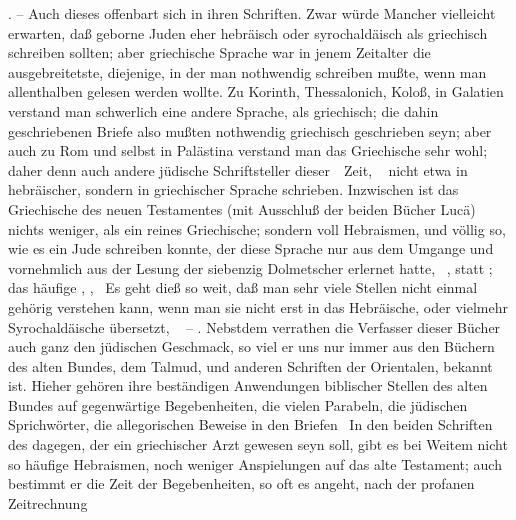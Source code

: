 \begin{aufza}
\item {}. -- Auch dieses offenbart sich in ihren Schriften. Zwar würde Mancher vielleicht erwarten, daß geborne Juden eher hebräisch oder syrochaldäisch als griechisch schreiben sollten; aber griechische Sprache war in jenem Zeitalter die ausgebreitetste, diejenige, in der man nothwendig schreiben mußte, wenn man allenthalben gelesen werden wollte. Zu Korinth, Thessalonich, Koloß, in Galatien verstand man schwerlich eine andere Sprache, als griechisch; die dahin geschriebenen Briefe also mußten nothwendig griechisch geschrieben seyn; aber auch zu Rom und selbst in Palästina verstand man das Griechische sehr wohl; daher denn auch andere jüdische Schriftsteller dieser~\ Zeit, \zB\  nicht etwa in hebräischer, sondern in griechischer Sprache schrieben. Inzwischen ist das Griechische des neuen Testamentes (mit Ausschluß der beiden Bücher Lucä) nichts weniger, als ein reines Griechische; sondern voll Hebraismen, und völlig so, wie es ein Jude schreiben konnte, der diese Sprache nur aus dem Umgange und vornehmlich aus der Lesung der siebenzig Dolmetscher erlernet hatte, \zB\ , statt ; das häufige , , \uam\ Es geht dieß so weit, daß man sehr viele Stellen nicht einmal gehörig verstehen kann, wenn man sie nicht erst in das Hebräische, oder vielmehr Syrochaldäische übersetzt, \zB\  -- . Nebstdem verrathen die Verfasser dieser Bücher auch ganz den jüdischen Geschmack, so viel er uns nur immer aus den Büchern des alten Bundes, dem Talmud, und anderen Schriften der Orientalen, bekannt ist. Hieher gehören ihre beständigen Anwendungen biblischer Stellen des alten Bundes auf gegenwärtige Begebenheiten, die vielen Parabeln, die jüdischen Sprichwörter, die allegorischen Beweise in den Briefen  \uam\ In den beiden Schriften des  dagegen, der ein griechischer Arzt gewesen seyn soll, gibt es bei Weitem nicht so häufige Hebraismen, noch weniger Anspielungen auf das alte Testament; auch bestimmt er die Zeit der Begebenheiten, so oft es angeht, nach der profanen Zeitrechnung \usw

\end{aufza}

